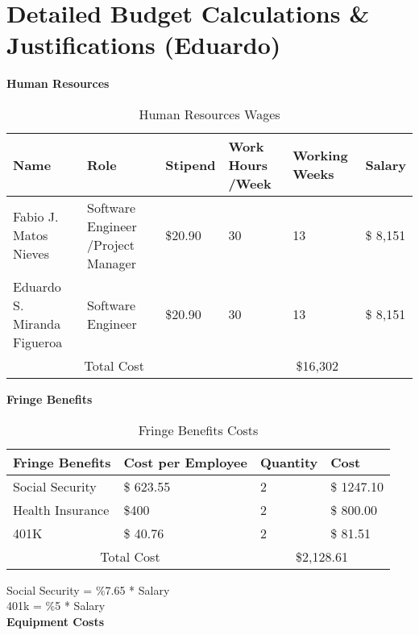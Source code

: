  \section{Detailed Budget Calculations \& Justifications (Eduardo)}
\begin{table}[h]
    \centering
    \textbf{Human Resources}
    \begin{tabular}{||m{}|m{}|m{}|m{}|m{}|m{}||}
     \hline
     Name & Role & Stipend & Work Hours /Week & Working Weeks & Salary\\
     \hline
     Fabio J. Matos Nieves & Software Engineer /Project Manager& \$20.90 & 30 & 13 & \$ 8,151\\ 
     \hline
     Eduardo S. Miranda Figueroa & Software Engineer & \$20.90 & 30 & 13 & \$ 8,151 \\
    
     \hline
     \multicolumn{3}{||c|}{Total Cost} & \multicolumn{3}{c||}{\$16,302}\\
     \hline
    \end{tabular}
    \caption {Human Resources Wages}
    \label{table:2}
\end{table}
\textbf{Fringe Benefits\cite{WhatAreFringe}}\\
\begin{table}[h]
    \begin{tabular}{||m{}|m{}|m{}|m{}||}
        \hline 
        Fringe Benefits & Cost per Employee & Quantity & Cost\\
        \hline
        Social Security &  \$ 623.55 & 2 & \$ 1247.10\\ 
        \hline
        Health Insurance & \$400 & 2 & \$ 800.00 \\
        \hline
        401K & \$ 40.76 & 2 & \$ 81.51\\ 

        \hline
        \multicolumn{2}{||c|}{Total Cost} & \multicolumn{2}{c||}{\$2,128.61}\\
        \hline
       \end{tabular}
       \caption {Fringe Benefits Costs}
       \label{table:3}
\end{table}
Social Security = \%7.65 * Salary\\
401k = \%5 * Salary\\
\textbf{Equipment Costs}\\
